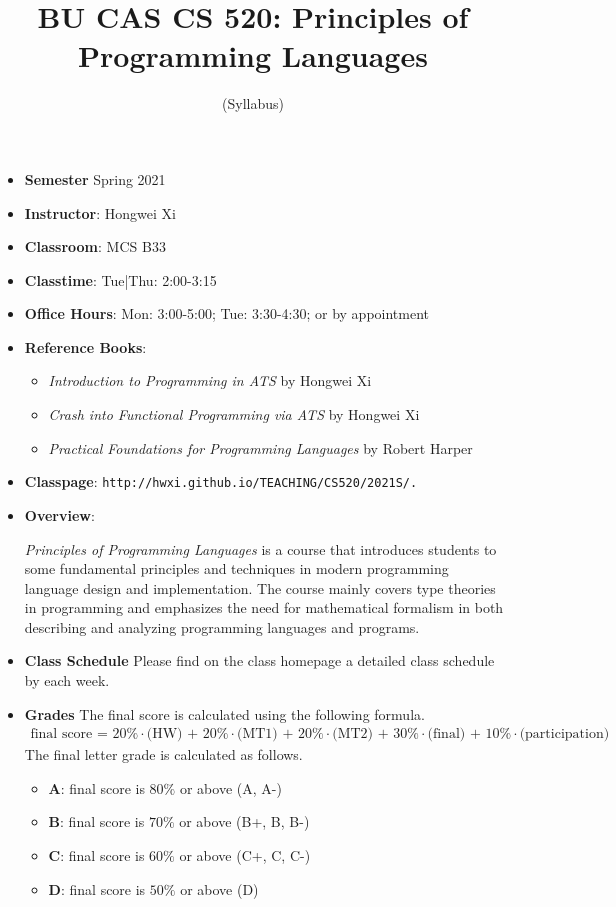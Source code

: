 \documentclass[11pt]{article}
\title{BU CAS CS 520: Principles of Programming Languages}
\author{(Syllabus)}
\date{}
\begin{document}
\maketitle
\thispagestyle{empty}

\begin{itemize}
\item {\bf Semester} Spring 2021
\item {\bf Instructor}: Hongwei Xi
\item {\bf Classroom}: MCS B33
\item {\bf Classtime}: Tue|Thu: 2:00-3:15
\item {\bf Office Hours}: Mon: 3:00-5:00; Tue: 3:30-4:30; or by appointment

\item {\bf Reference Books}:\kern6pt
\begin{itemize}
\item
{\em Introduction to Programming in ATS} by Hongwei Xi
\item
{\em Crash into Functional Programming via ATS} by Hongwei Xi
\item
{\em Practical Foundations for Programming Languages} by Robert Harper
\end{itemize}

\item {\bf Classpage}: {\tt http://hwxi.github.io/TEACHING/CS520/2021S/.}

\item {\bf Overview}:

{\em Principles of Programming Languages} is a course
that introduces students to some fundamental principles and techniques in
modern programming language design and implementation. The course mainly
covers type theories in programming and emphasizes the need for
mathematical formalism in both describing and analyzing programming
languages and programs.

\item {\bf Class Schedule}
Please find on the class homepage a detailed class schedule by each week.

\item {\bf Grades}
The final score is calculated using the following formula.
\[\begin{array}{l}
\mbox{final score = 20\%$\cdot$(HW) + 20\%$\cdot$(MT1) + 20\%$\cdot$(MT2) + 30\%$\cdot$(final) + 10\%$\cdot$(participation)}
\end{array}\]
The final letter grade is calculated as follows.
\begin{itemize}
\item{\bf A}: final score is $80\%$ or above (A, A-)
\item{\bf B}: final score is $70\%$ or above (B+, B, B-)
\item{\bf C}: final score is $60\%$ or above (C+, C, C-)
\item{\bf D}: final score is $50\%$ or above (D)
\end{itemize}


\end{itemize}
\end{document}
